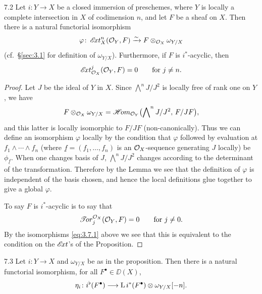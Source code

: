 \begin{bookproposition}{7.2}\label{prop:3.7.2}
Let $i\colon Y\to X$ be a closed immersion of preschemes, where $Y$ is locally a complete intersection in $X$ of codimension $n$, and let $F$ be a sheaf on $X$. Then there is a natural functorial isomorphism
\[
\varphi \colon \mathop{\mathscr{E}\!xt}\nolimits^n_X(\mathcal{O}_Y, F) \xrightarrow{\sim} F\otimes_{\mathcal{O}_X}\omega_{Y/X}
\]
(cf.\ \S\ref{sec:3.1} for definition of $\omega_{Y/X}$). Furthermore, if $F$ is $i^*$-acyclic, then
\[
\mathop{\mathscr{E}\!xt}\nolimits_{\mathcal{O}_X}^j(\mathcal{O}_Y, F)=0 \qquad \text{for } j\neq n.
\]
\end{bookproposition}

\begin{proof}
Let $J$ be the ideal of $Y$ in $X$. Since $\bigwedge^n J/J^2$ is locally free of rank one on $Y$, we have
\[
F\otimes_{\mathcal{O}_X}\omega_{Y/X} = \mathop{\mathscr{H}\!om}\nolimits_{\mathcal{O}_Y}\bigl(\bigwedge\nolimits^n J/J^2,\, F/JF\bigr),
\]
and this latter is locally isomorphic to $F/JF$ (non-canonically). Thus we can define an isomorphism $\varphi$ locally by the condition that $\varphi$ followed by evaluation at $f_1\wedge\cdots\wedge f_n$ (where $\underline{f}=(f_1,\dots,f_n)$ is an $\mathcal{O}_X$-sequence generating $J$ locally) be $\phi_{\underline{f}}$. When one changes basis of $J$, $\bigwedge^n J/J^2$ changes according to the determinant of the transformation. Therefore by the Lemma we see that the definition of $\varphi$ is independent of the basis chosen, and hence the local definitions glue together to give a global $\varphi$.

To say $F$ is $i^*$-acyclic is to say that
\[
\mathop{\mathscr{T}\!or}\nolimits_j^{\mathcal{O}_X}(\mathcal{O}_Y,F) = 0 \qquad \text{for } j\neq 0.
\]
By the isomorphisms \eqref{eq:3.7.1} above we see that this is equivalent to the condition on the $\mathop{\mathscr{E}\!xt}\nolimits$'s of the Proposition.
\end{proof}

\begin{bookcorollary}{7.3}\label{cor:3.7.3}
Let $i\colon Y\to X$ and $\omega_{Y/X}$ be as in the proposition. Then there is a natural functorial isomorphism, for all $F^\bullet\in\DD(X)$,
\[
\eta_i \colon i^{\flat}(F^\bullet) \longrightarrow \operatorname{L} i^*(F^\bullet)\otimes\omega_{Y/X}[-n].
\]
\end{bookcorollary}


